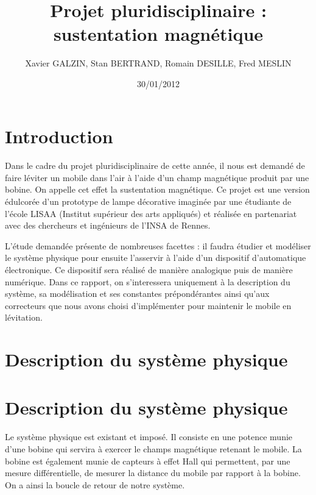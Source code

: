 \documentclass[11pt, french]{article} %
\title{Projet pluridisciplinaire : sustentation magnétique}
\author{ Xavier GALZIN, Stan BERTRAND, Romain DESILLE, Fred MESLIN}
\date{30/01/2012}
\begin{document}
\maketitle
\pagebreak

\section{Introduction}
\paragraph{}
	Dans le cadre du projet pluridisciplinaire de cette année, il nous est demandé de faire léviter un mobile dans l'air à l'aide d'un champ magnétique produit par une bobine. On appelle cet effet la sustentation magnétique. Ce projet est une version édulcorée d'un prototype de lampe décorative imaginée par une étudiante de l'école LISAA (Institut supérieur des arts appliqués) et réalisée en partenariat avec des chercheurs et ingénieurs de l'INSA de Rennes.

L'étude demandée présente de nombreuses facettes : il faudra étudier et modéliser le système physique pour ensuite l'asservir à l'aide d'un dispositif d'automatique électronique. Ce dispositif sera réalisé de manière analogique puis de manière numérique. Dans ce rapport, on s'interessera uniquement à la description du système, sa modélisation et ses constantes prépondérantes ainsi qu'aux correcteurs que nous avons choisi d'implémenter pour maintenir le mobile en lévitation.

\section{Description du système physique}
\paragraph{}
\section{Description du système physique}
\paragraph{}
Le système physique est existant et imposé. Il consiste en une potence munie d'une bobine qui servira à exercer le champs magnétique retenant le mobile. La bobine est également munie de capteurs à effet Hall qui permettent, par une mesure différentielle, de mesurer la distance du mobile par rapport à la bobine. On a ainsi la boucle de retour de notre système. 
\end{document}
